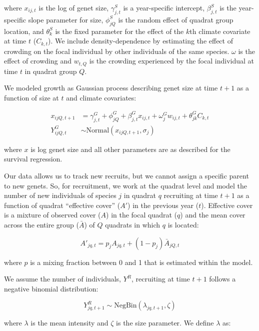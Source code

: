 \documentclass[12pt,]{article}
\begin{document}
where $x_{ij,t}$ is the log of genet size, $\gamma^{S}_{j,t}$ is a
year-specific intercept, $\beta^{S}_{j,t}$ is the year-specific slope
parameter for size, $\phi^{S}_{jQ}$ is the random effect of quadrat
group location, and $\theta^{S}_{k}$ is the fixed parameter for the
effect of the $k$th climate covariate at time $t$ ($C_{k,t}$). We
include density-dependence by estimating the effect of crowding on the
focal individual by other individuals of the same species. $\omega$ is
the effect of crowding and $w_{t,Q}$ is the crowding experienced by the
focal individual at time $t$ in quadrat group $Q$.

We modeled growth as Gaussian process describing genet size at time
$t+1$ as a function of size at $t$ and climate covariates:

\begin{align}
x_{ijQ,t+1} &= \gamma^{G}_{j,t} + \phi^{G}_{jQ} + \beta^{G}_{j,t}x_{ij,t} + \omega^{G}_{j}w_{ij,t} + \theta^{G}_{jk}C_{k,t} \\
Y^{G}_{ijQ,t} &\sim \text{Normal}(x_{ijQ,t+1}, \sigma_{j})
\end{align}

where $x$ is log genet size and all other parameters are as described
for the survival regression.

Our data allows us to track new recruits, but we cannot assign a
specific parent to new genets. So, for recruitment, we work at the
quadrat level and model the number of new individuals of species $j$ in
quadrat $q$ recruiting at time $t+1$ as a function of quadrat
``effective cover'' ($A'$) in the previous year ($t$). Effective cover
is a mixture of observed cover ($A$) in the focal quadrat ($q$) and the
mean cover across the entire group ($\bar{A}$) of $Q$ quadrats in which
$q$ is located:

\begin{equation}
A'_{jq,t} = p_{j}A_{jq,t} + (1-p_{j})\bar{A}_{jQ,t}
\end{equation}

where $p$ is a mixing fraction between 0 and 1 that is estimated within
the model.

We assume the number of individuals, $Y^{R}$, recruiting at time $t+1$
follows a negative binomial distribution:

\begin{equation}
Y^{R}_{jq,t+1} \sim \text{NegBin}(\lambda_{jq,t+1},\zeta)
\end{equation}

where $\lambda$ is the mean intensity and $\zeta$ is the size parameter.
We define $\lambda$ as:
\end{document}
